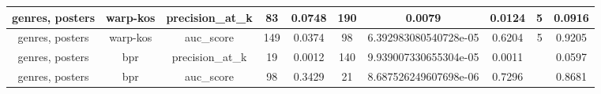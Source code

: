 \begin{table}
{\begin{tabular}{|c|c|c|c|c|c|c|c|c|c|}
\hline
genres, posters          & warp-kos              & precision\_at\_k          & 83     & 0.0748   & 190           & 0.0079   & 0.0124  & 5    & 0.0916                    \\ 
\hline
genres, posters          & warp-kos              & auc\_score                & 149    & 0.0374    & 98            & 6.392983080540728e-05  & 0.6204    & 5    & 0.9205                    \\ 
\hline
genres, posters          & bpr                   & precision\_at\_k          & 19     & 0.0012 & 140           & 9.939007330655304e-05  & 0.0011 &      & 0.0597                    \\ 
\hline
genres, posters          & bpr                   & auc\_score                & 98     & 0.3429    & 21            & 8.687526249607698e-06  & 0.7296    &      & 0.8681                    \\
\hline
\end{tabular}}
\end{table}

